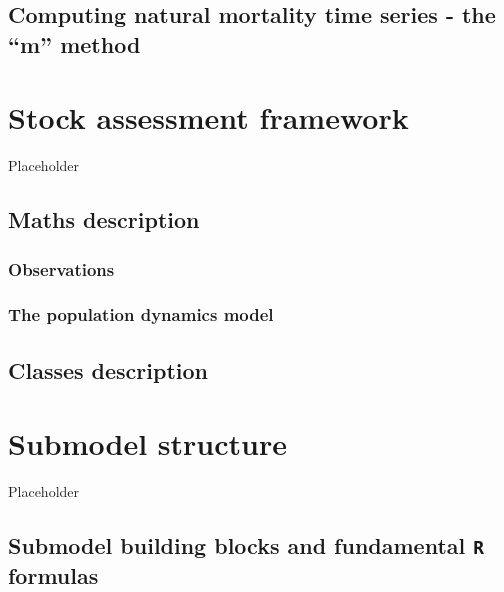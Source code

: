 \documentclass[
]{book}
\begin{document}
\hypertarget{computing-natural-mortality-time-series---the-m-method}{%
\section{Computing natural mortality time series - the ``m'' method}\label{computing-natural-mortality-time-series---the-m-method}}

\hypertarget{stock-assessment-framework}{%
\chapter{Stock assessment framework}\label{stock-assessment-framework}}

Placeholder

\hypertarget{maths-description}{%
\section{\texorpdfstring{Maths description \label{sec:math}}{Maths description }}\label{maths-description}}

\hypertarget{observations}{%
\subsection{Observations}\label{observations}}

\hypertarget{the-population-dynamics-model}{%
\subsection{The population dynamics model}\label{the-population-dynamics-model}}

\hypertarget{classes-description}{%
\section{\texorpdfstring{Classes description \label{sec:classes}}{Classes description }}\label{classes-description}}

\hypertarget{submodel-structure}{%
\chapter{\texorpdfstring{Submodel structure \label{sec:submod}}{Submodel structure }}\label{submodel-structure}}

Placeholder

\hypertarget{submodel-building-blocks-and-fundamental-r-formulas}{%
\section{\texorpdfstring{Submodel building blocks and fundamental \texttt{R} formulas}{Submodel building blocks and fundamental R formulas}}\label{submodel-building-blocks-and-fundamental-r-formulas}}
\end{document}
